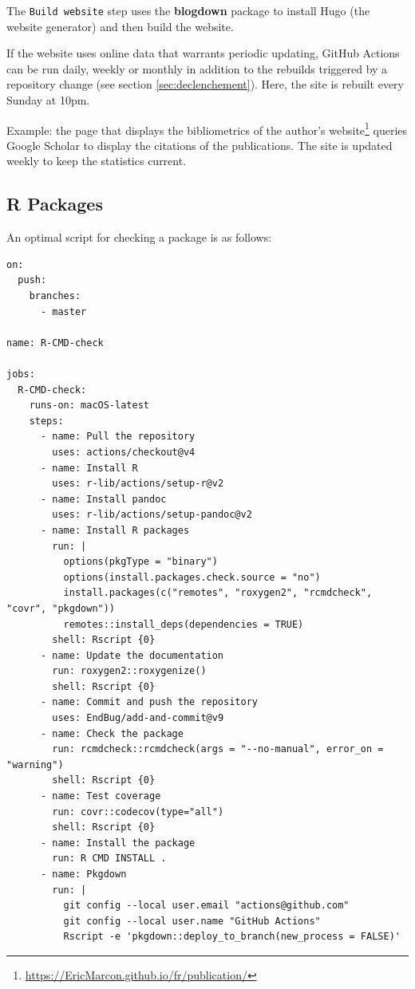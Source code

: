 \documentclass[
  12pt,
  american,
  a4paper,
  extrafontsizes,onecolumn,openright
  ]{memoir}
\begin{document}
The \texttt{Build\ website} step uses the \textbf{blogdown} package to install Hugo (the website generator) and then build the website.

If the website uses online data that warrants periodic updating, GitHub Actions can be run daily, weekly or monthly in addition to the rebuilds triggered by a repository change (see section \ref{sec:declenchement}).
Here, the site is rebuilt every Sunday at 10pm.

Example: the page that displays the bibliometrics of the author's website\footnote{\url{https://EricMarcon.github.io/fr/publication/}} queries Google Scholar to display the citations of the publications.
The site is updated weekly to keep the statistics current.

\subsection{R Packages}\label{sec:package-ci6}

An optimal script for checking a package is as follows:

\begin{verbatim}
on:
  push:
    branches:
      - master

name: R-CMD-check

jobs:
  R-CMD-check:
    runs-on: macOS-latest
    steps:
      - name: Pull the repository
        uses: actions/checkout@v4
      - name: Install R
        uses: r-lib/actions/setup-r@v2
      - name: Install pandoc
        uses: r-lib/actions/setup-pandoc@v2
      - name: Install R packages
        run: |
          options(pkgType = "binary")
          options(install.packages.check.source = "no")
          install.packages(c("remotes", "roxygen2", "rcmdcheck", "covr", "pkgdown"))
          remotes::install_deps(dependencies = TRUE)
        shell: Rscript {0}
      - name: Update the documentation
        run: roxygen2::roxygenize()
        shell: Rscript {0}
      - name: Commit and push the repository
        uses: EndBug/add-and-commit@v9
      - name: Check the package
        run: rcmdcheck::rcmdcheck(args = "--no-manual", error_on = "warning")
        shell: Rscript {0}
      - name: Test coverage
        run: covr::codecov(type="all")
        shell: Rscript {0}
      - name: Install the package
        run: R CMD INSTALL .
      - name: Pkgdown
        run: |
          git config --local user.email "actions@github.com"
          git config --local user.name "GitHub Actions"
          Rscript -e 'pkgdown::deploy_to_branch(new_process = FALSE)'
\end{verbatim}
\end{document}
